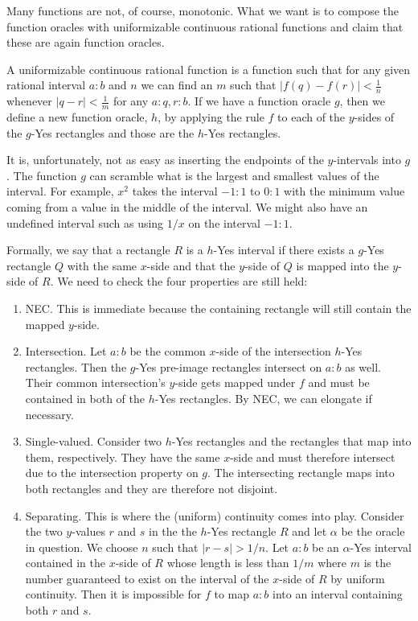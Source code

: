 \documentclass[12pt]{article}
\theoremstyle{remark}
\begin{document}
Many functions are not, of course, monotonic. What we want is to compose the function oracles with uniformizable continuous rational functions and claim that these are again function oracles. 

A uniformizable continuous rational function is a function such that for any given rational interval $a:b$ and $n$ we can find an $m$ such that $|f(q) - f(r)| < \frac{1}{n} $ whenever $|q-r| < \frac{1}{m}$ for any $a:q,r:b$. If we have a function oracle $g$, then we define a new function oracle, $h$, by applying the rule $f$ to each of the $y$-sides of the $g$-Yes rectangles and those are the $h$-Yes rectangles. 

It is, unfortunately, not as easy as inserting the endpoints of the $y$-intervals into $g$. The function $g$ can scramble what is the largest and smallest values of the interval. For example, $x^2$ takes the interval $-1:1$ to $0:1$ with the minimum value coming from a value in the middle of the interval. We might also have an undefined interval such as using $1/x$ on the interval $-1:1$.

Formally, we say that a rectangle $R$ is a $h$-Yes interval if there exists a $g$-Yes rectangle $Q$ with the same $x$-side and that the $y$-side of $Q$ is mapped into the $y$-side of $R$. We need to check the four properties are still held: 

\begin{enumerate} 
\item NEC. This is immediate because the containing rectangle will still contain the mapped $y$-side. 
\item Intersection. Let $a:b$ be the common $x$-side of the intersection $h$-Yes rectangles. Then the $g$-Yes pre-image rectangles intersect on $a:b$ as well. Their common intersection's $y$-side gets mapped under $f$ and must be contained in both of the $h$-Yes rectangles. By NEC, we can elongate if necessary. 
\item Single-valued. Consider two $h$-Yes rectangles and the rectangles that map into them, respectively. They have the same $x$-side and must therefore intersect due to the intersection property on $g$. The intersecting rectangle maps into both rectangles and they are therefore not disjoint.  
\item Separating. This is where the (uniform) continuity comes into play.  Consider the two $y$-values $r$ and $s$ in the the $h$-Yes rectangle $R$ and let $\alpha$ be the oracle in question. We choose $n$ such that $|r-s| > 1/n$. Let $a:b$ be an $\alpha$-Yes interval contained in the $x$-side of $R$ whose length is less than $1/m$ where $m$ is the number guaranteed to exist on the interval of the $x$-side of $R$ by uniform continuity. Then it is impossible for $f$ to map $a:b$ into an interval containing both $r$ and $s$.
\end{enumerate}
\end{document}
